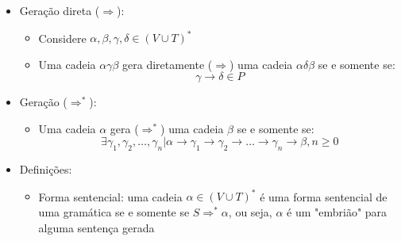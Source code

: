 \documentclass[12pt]{article}
\begin{document}
\begin{itemize}
\begin{enumerate}
        \item $G_2 = (\{S,A,B,C\}, \{a,b,c\}, P, S)$ onde:
        
            $P = \{1) S\rightarrow A \\
                2) A \rightarrow BaC \\
                3) B \rightarrow bB \\
                4) B \rightarrow b \\
                5) C \rightarrow cC \\
                6) C \rightarrow c\}$
    \end{enumerate}
    \begin{itemize}
        \item A linguagem gerada pela gramática $G_1$ descrita acima, poderia 
        ser expressa da seguinte forma: $L(G_1) = \{ab^nc, n \geq 0\}$
        \item A linguagem gerada pela gramática $G_2$ descrita acima, poderia 
        ser expressa da seguinte forma: $L(G_2) = \{b^mac^n, m \geq 1, n \geq 1\}$
    \end{itemize}
    \item Geração direta ($\Rightarrow$):
    \begin{itemize}
        \item Considere $\alpha, \beta, \gamma, \delta \in (V \cup T)^*$
        \item Uma cadeia $\alpha\gamma\beta$ gera diretamente ($\Rightarrow$) 
        uma cadeia $\alpha\delta\beta$ se e somente se: 
        \[\gamma \rightarrow \delta \in P\]
    \end{itemize}
    \item Geração ($\Rightarrow^*$):
    \begin{itemize}
        \item Uma cadeia $\alpha$ gera ($\Rightarrow^*$) uma cadeia $\beta$ se 
        e somente se:
        \[\exists \gamma_1,\gamma_2, \ldots, \gamma_n | \alpha \rightarrow 
        \gamma_1 \rightarrow \gamma_2 \rightarrow \ldots \rightarrow \gamma_n 
        \rightarrow \beta, n \geq 0\]
    \end{itemize}
    \item Definições:
    \begin{itemize}
        \item Forma sentencial: uma cadeia $\alpha \in (V \cup T)^*$ é uma 
        forma sentencial de uma gramática se e somente se $S \Rightarrow^* 
        \alpha$, ou seja, $\alpha$ é um "embrião" para alguma sentença gerada 

\end{itemize}
\end{itemize}
\end{document}
